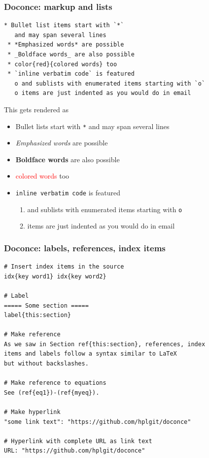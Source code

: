 \documentclass{beamer}
\begin{document}
\begin{frame}
\frametitle{Doconce: markup and lists}

\begin{Verbatim}[numbers=none,fontsize=\fontsize{9pt}{9pt},baselinestretch=0.95]
 * Bullet list items start with `*`
   and may span several lines
 * *Emphasized words* are possible
 * _Boldface words_ are also possible
 * color{red}{colored words} too
 * `inline verbatim code` is featured
   o and sublists with enumerated items starting with `o`
   o items are just indented as you would do in email
\end{Verbatim}

This gets rendered as

\begin{itemize}
 \item Bullet lists start with \Verb!*!
   and may span several lines

 \item \emph{Emphasized words} are possible

 \item \textbf{Boldface words} are also possible

 \item \textcolor{red}{colored words} too

 \item \Verb!inline verbatim code! is featured
\begin{enumerate}

  \item and sublists with enumerated items starting with \Verb!o!

  \item items are just indented as you would do in email
\end{enumerate}

\noindent
\end{itemize}

\noindent
\end{frame}

\begin{frame}
\frametitle{Doconce: labels, references, index items}

\begin{Verbatim}[numbers=none,fontsize=\fontsize{9pt}{9pt},baselinestretch=0.95]
# Insert index items in the source
idx{key word1} idx{key word2}

# Label
===== Some section =====
label{this:section}

# Make reference
As we saw in Section ref{this:section}, references, index
items and labels follow a syntax similar to LaTeX
but without backslashes.

# Make reference to equations
See (ref{eq1})-(ref{myeq}).

# Make hyperlink
"some link text": "https://github.com/hplgit/doconce"

# Hyperlink with complete URL as link text
URL: "https://github.com/hplgit/doconce"
\end{Verbatim}
\end{frame}
\end{document}

